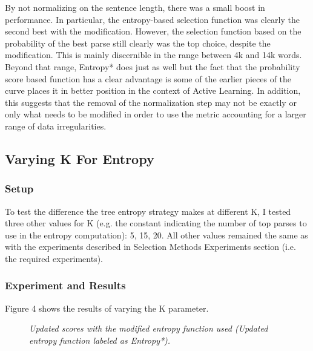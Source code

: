 \documentclass{article} %
\begin{document}
By not normalizing on the sentence length, there was a small boost in performance. In particular, the entropy-based selection function was clearly the second best with the modification. However, the selection function based on the probability of the best parse still clearly was the top choice, despite the modification. This is mainly discernible in the range between 4k and 14k words. Beyond that range, Entropy* does just as well but the fact that the probability score based function has a clear advantage is some of the earlier pieces of the curve places it in better position in the context of Active Learning. In addition, this suggests that the removal of the normalization step may not be exactly or only what needs to be modified in order to use the metric accounting for a larger range of data irregularities.

\subsection{Varying K For Entropy}

\subsubsection{Setup}

To test the difference the tree entropy strategy makes at different K, I tested three other values for K (e.g. the constant indicating the number of top parses to use in the entropy computation): 5, 15, 20. All other values remained the same as with the experiments described in Selection Methods Experiments section (i.e. the required experiments). 

\subsubsection{Experiment and Results}

Figure 4 shows the results of varying the K parameter.

\begin{figure}[h]%
	\centering
    \caption{\textit{Updated scores with the modified entropy function used (Updated entropy function labeled as Entropy*).}}
    \label{fig:default}
\end{figure}
\end{document}
